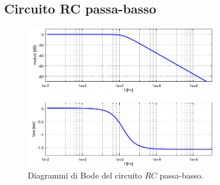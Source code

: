 \subsection{Circuito RC passa-basso}

\begin{figure}[H]
    \centering
    \includegraphics[width=0.75\textwidth]{Immagini/DiagrammiBodePassaBasso.png}
    \caption{Diagrammi di Bode del circuito $RC$ passa-basso.}
    \label{figure: Impedenza}
\end{figure}
